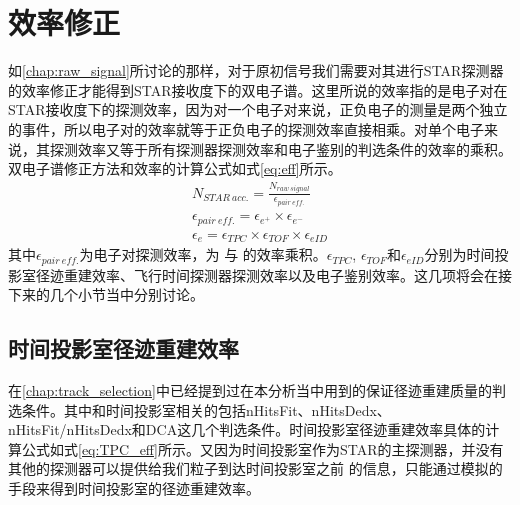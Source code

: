 \section{效率修正}
\label{chap:efficiency}
如\ref{chap:raw_signal}所讨论的那样，对于原初信号我们需要对其进行STAR探测器的效率修正才能得到STAR接收度下的双电子谱。这里所说的效率指的是电子对在STAR接收度下的探测效率，因为对一个电子对来说，正负电子的测量是两个独立的事件，所以电子对的效率就等于正负电子的探测效率直接相乘。对单个电子来说，其探测效率又等于所有探测器探测效率和电子鉴别的判选条件的效率的乘积。双电子谱修正方法和效率的计算公式如式\ref{eq:eff}所示。
\begin{equation}
    \begin{split}
        N_{STAR~acc.} = \frac{ N_{raw~signal} }{ \epsilon_{pair~eff.} }\\
        \epsilon_{pair~eff.} = \epsilon_{e^{+}}\times\epsilon_{e^{-}}\\
        \epsilon_{e} = \epsilon_{TPC}\times\epsilon_{TOF}\times\epsilon_{eID}
    \end{split}
\label{eq:eff}
\end{equation}
其中$\epsilon_{pair~eff.}$为电子对探测效率，为 \eplus 与 \eminus 的效率乘积。$\epsilon_{TPC}$, $\epsilon_{TOF}$和$\epsilon_{eID}$分别为时间投影室径迹重建效率、飞行时间探测器探测效率以及电子鉴别效率。这几项将会在接下来的几个小节当中分别讨论。

\subsection{时间投影室径迹重建效率}
在\ref{chap:track_selection}中已经提到过在本分析当中用到的保证径迹重建质量的判选条件。其中和时间投影室相关的包括nHitsFit、nHitsDedx、nHitsFit/nHitsDedx和DCA这几个判选条件。时间投影室径迹重建效率具体的计算公式如式\ref{eq:TPC_eff}所示。又因为时间投影室作为STAR的主探测器，并没有其他的探测器可以提供给我们粒子到达时间投影室之前 的信息，只能通过模拟的手段来得到时间投影室的径迹重建效率。

